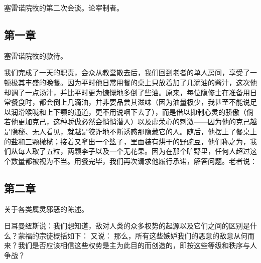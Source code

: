 \par

塞雷诺院牧的第二次会谈。论宰制者。\par


\subsection{第一章}

塞雷诺院牧的款待。\par

我们完成了一天的职责，会众从教堂散去后，我们回到老者的单人房间，享受了一顿极其丰盛的晚餐。因为平时他日常用餐的桌上只放着加了几滴油的酱汁，这次他却调了一点汤汁，并比平时更为慷慨地多倒了些油。原来，每位隐修士在准备用日常餐食时，都会倒上几滴油，并非要品尝其滋味（因为油量极少，我甚至不能说足以润滑喉咙和上下颚的通道，更不用说咽下去了），而是借以抑制心灵的骄傲（倘若他更加克己，这种骄傲必然会悄悄潜入）以及虚荣心的刺激——因为他的克己越是隐秘、无人看见，就越是狡诈地不断诱惑那隐藏它的人。随后，他摆上了餐桌上的盐和三颗橄榄；接着又拿出一个篮子，里面装有烘干的野豌豆，他们称之为，我们从每人取了五粒，两颗李子以及一个无花果。因为在那个旷野里，任何人超过这个数量都被视为不当。用餐完毕，我们再次请求他履行承诺，解答问题。老者说：\par


\subsection{第二章}

关于各类属灵邪恶的陈述。\par

日耳曼纽斯说：我们想知道，敌对人类的众多权势的起源以及它们之间的区别是什么？蒙福的宗徒概括如下：  又说：  那么，所有这些嫉妒我们的恶意的敌意从何而来？我们是否应该相信这些权势是主为此目的而创造的，即按这些等级和秩序与人争战？\par


